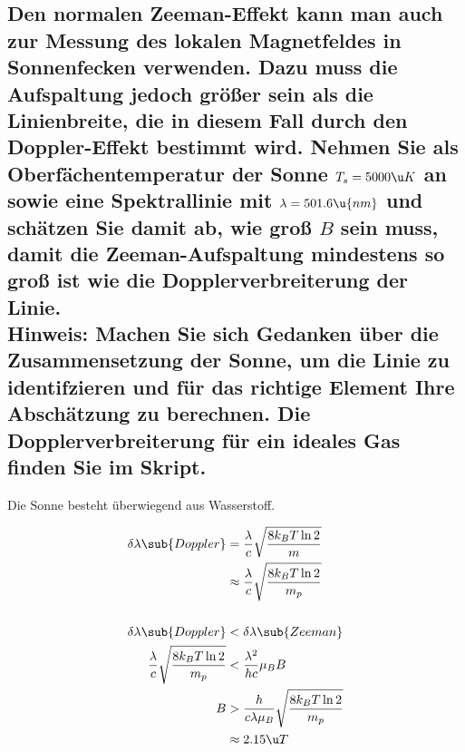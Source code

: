 \documentclass[ex, minted]{exercise_4.1}
\begin{document}
\subsection{Den normalen Zeeman-Effekt kann man auch zur Messung des lokalen Magnetfeldes in Sonnenfecken verwenden. Dazu muss die Aufspaltung jedoch größer sein als die Linienbreite, die in diesem Fall durch den Doppler-Effekt bestimmt wird. Nehmen Sie als Oberfächentemperatur der Sonne $T_s = 5000 \u K$ an
sowie eine Spektrallinie mit $\lambda = 501.6 \u{nm}$ und schätzen Sie damit ab, wie groß $B$ sein muss, damit die Zeeman-Aufspaltung mindestens so groß ist wie die Dopplerverbreiterung der Linie.\\
Hinweis: Machen Sie sich Gedanken über die Zusammensetzung der Sonne, um die Linie zu identifzieren
und für das richtige Element Ihre Abschätzung zu berechnen. Die Dopplerverbreiterung für ein ideales Gas finden Sie im Skript.}

\dottedlinett

Die Sonne besteht überwiegend aus Wasserstoff.

\begin{align*}
    \delta \lambda\sub{Doppler} 
    &= \frac{\lambda}{c} \sqrt{\frac{8 k_B T \ln 2}{m}}\\
    &\approx \frac{\lambda}{c} \sqrt{\frac{8 k_B T \ln 2}{m_p}}\\
    \\
    \delta \lambda\sub{Doppler} &< \delta \lambda\sub{Zeeman}\\
    \frac{\lambda}{c} \sqrt{\frac{8 k_B T \ln 2}{m_p}} &<  \frac{\lambda^2}{hc} \mu_B B\\
    B &> \frac{h}{c\lambda \mu_B } \sqrt{\frac{8 k_B T \ln 2}{m_p}}\\
    &\approx 2.15\u T
\end{align*}
\end{document}
